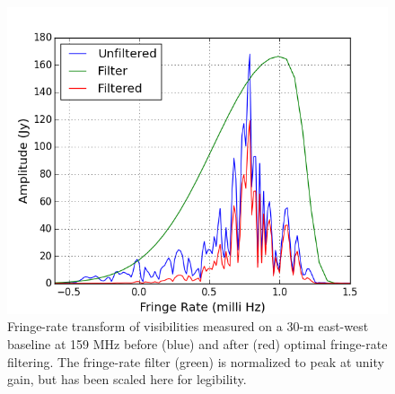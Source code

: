 \documentclass[twocolumn,numberedappendix]{emulateapj} \shorttitle{PSA64}
\begin{document}
\begin{figure}[t!]\centering
\includegraphics[width=\columnwidth]{plots/fr_preserved_signal.png}
\caption{
Fringe-rate transform of visibilities measured on a 30-m east-west baseline at 159 MHz before (blue) and
after (red) optimal fringe-rate filtering. The fringe-rate filter (green) is normalized
to peak at unity gain, but has been scaled here for legibility.
}
\label{fig:fr_preserved_signal}
\end{figure}
\end{document}
